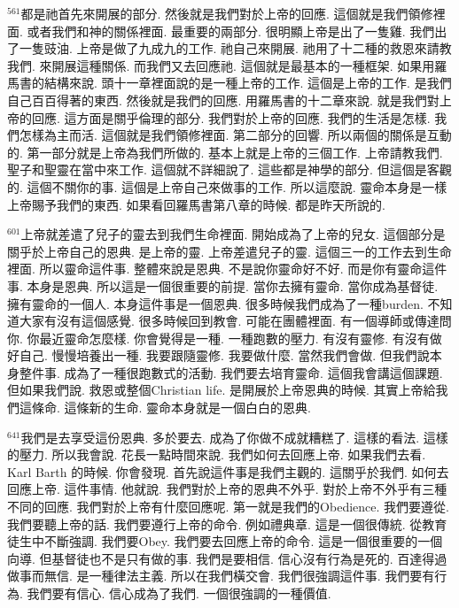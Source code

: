 \documentclass{book}
\begin{document}
$^{561}$都是祂首先來開展的部分.
然後就是我們對於上帝的回應.
這個就是我們領修裡面.
或者我們和神的關係裡面.
最重要的兩部分.
很明顯上帝是出了一隻雞.
我們出了一隻豉油.
上帝是做了九成九的工作.
祂自己來開展.
祂用了十二種的救恩來請教我們.
來開展這種關係.
而我們又去回應祂.
這個就是最基本的一種框架.
如果用羅馬書的結構來說.
頭十一章裡面說的是一種上帝的工作.
這個是上帝的工作.
是我們自己百百得著的東西.
然後就是我們的回應.
用羅馬書的十二章來說.
就是我們對上帝的回應.
這方面是關乎倫理的部分.
我們對於上帝的回應.
我們的生活是怎樣.
我們怎樣為主而活.
這個就是我們領修裡面.
第二部分的回響.
所以兩個的關係是互動的.
第一部分就是上帝為我們所做的.
基本上就是上帝的三個工作.
上帝請教我們.
聖子和聖靈在當中來工作.
這個就不詳細說了.
這些都是神學的部分.
但這個是客觀的.
這個不關你的事.
這個是上帝自己來做事的工作.
所以這麼說.
靈命本身是一樣上帝賜予我們的東西.
如果看回羅馬書第八章的時候.
都是昨天所說的.

$^{601}$上帝就差遣了兒子的靈去到我們生命裡面.
開始成為了上帝的兒女.
這個部分是關乎於上帝自己的恩典.
是上帝的靈.
上帝差遣兒子的靈.
這個三一的工作去到生命裡面.
所以靈命這件事.
整體來說是恩典.
不是說你靈命好不好.
而是你有靈命這件事.
本身是恩典.
所以這是一個很重要的前提.
當你去擁有靈命.
當你成為基督徒.
擁有靈命的一個人.
本身這件事是一個恩典.
很多時候我們成為了一種burden.
不知道大家有沒有這個感覺.
很多時候回到教會.
可能在團體裡面.
有一個導師或傳達問你.
你最近靈命怎麼樣.
你會覺得是一種.
一種跑數的壓力.
有沒有靈修.
有沒有做好自己.
慢慢培養出一種.
我要跟隨靈修.
我要做什麼.
當然我們會做.
但我們說本身整件事.
成為了一種很跑數式的活動.
我們要去培育靈命.
這個我會講這個課題.
但如果我們說.
救恩或整個Christian life.
是開展於上帝恩典的時候.
其實上帝給我們這條命.
這條新的生命.
靈命本身就是一個白白的恩典.

$^{641}$我們是去享受這份恩典.
多於要去.
成為了你做不成就糟糕了.
這樣的看法.
這樣的壓力.
所以我會說.
花長一點時間來說.
我們如何去回應上帝.
如果我們去看.
Karl Barth 的時候.
你會發現.
首先說這件事是我們主觀的.
這關乎於我們.
如何去回應上帝.
這件事情.
他就說.
我們對於上帝的恩典不外乎.
對於上帝不外乎有三種不同的回應.
我們對於上帝有什麼回應呢.
第一就是我們的Obedience.
我們要遵從.
我們要聽上帝的話.
我們要遵行上帝的命令.
例如禮典章.
這是一個很傳統.
從教育徒生中不斷強調.
我們要Obey.
我們要去回應上帝的命令.
這是一個很重要的一個向導.
但基督徒也不是只有做的事.
我們是要相信.
信心沒有行為是死的.
百達得過做事而無信.
是一種律法主義.
所以在我們橫交會.
我們很強調這件事.
我們要有行為.
我們要有信心.
信心成為了我們.
一個很強調的一種價值.
\end{document}

